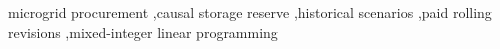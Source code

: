 microgrid procurement \sep  causal storage reserve \sep  historical scenarios \sep  paid rolling revisions \sep  mixed-integer linear programming

